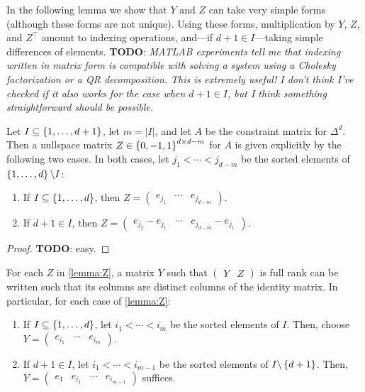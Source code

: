\documentclass[eikonal.tex]{subfiles}
\begin{document}
In the following lemma we show that $Y$ and $Z$ can take very simple
forms (although these forms are not unique). Using these forms,
multiplication by $Y$, $Z$, and $Z^\top$ amount to indexing
operations, and---if $d + 1 \in I$---taking simple differences of
elements. \textbf{TODO}: \emph{MATLAB experiments tell me that
  indexing written in matrix form is compatible with solving a system
  using a Cholesky factorization or a QR decomposition. This is
  extremely useful! I don't think I've checked if it also works for
  the case when $d + 1 \in I$, but I think something straightforward
  should be possible.}

\begin{lemma}\label{lemma:Z}
  Let $I \subseteq \left\{1, \hdots, d + 1\right\}$, let $m = |I|$, and let $A$
  be the constraint matrix for $\Delta^d$. Then a nullspace matrix
  $Z \in \left\{0, -1, 1\right\}^{d \times d - m}$ for $A$ is given explicitly
  by the following two cases. In both cases, let
  $j_1 < \cdots < j_{d - m}$ be the sorted elements of
  $\left\{1, \hdots, d\right\} \backslash I$:
  \begin{enumerate}
  \item If $I \subseteq \left\{1, \hdots, d\right\}$, then
    $Z = \begin{pmatrix} e_{j_1} & \cdots &
      e_{j_{d-m}} \end{pmatrix}$.
  \item If $d + 1 \in I$, then
    $Z = \begin{pmatrix} e_{j_2} - e_{j_1} & \cdots & e_{j_{d-m}} -
      e_{j_1}
      \end{pmatrix}$.
  \end{enumerate}
\end{lemma}

\begin{proof}
  \textbf{TODO}: easy.
\end{proof}

\begin{corollary}
  For each $Z$ in \cref{lemma:Z}, a matrix $Y$ such that
  $\begin{pmatrix} Y & Z \end{pmatrix}$ is full rank can be written
  such that its columns are distinct columns of the identity
  matrix. In particular, for each case of \cref{lemma:Z}:
  \begin{enumerate}
  \item If $I \subseteq \left\{1, \hdots, d\right\}$, let $i_1 < \cdots < i_m$
    be the sorted elements of $I$. Then, choose
    $Y = \begin{pmatrix} e_{i_1} & \cdots & e_{i_m} \end{pmatrix}$.
  \item If $d + 1 \in I$, let $i_1 < \cdots < i_{m-1}$ be the sorted
    elements of $I \backslash \left\{d + 1\right\}$. Then,
    $Y = \begin{pmatrix} e_1 & e_{i_1} & \cdots &
        e_{i_{m-1}} \end{pmatrix}$ suffices.
  \end{enumerate}
\end{corollary}
\end{document}
